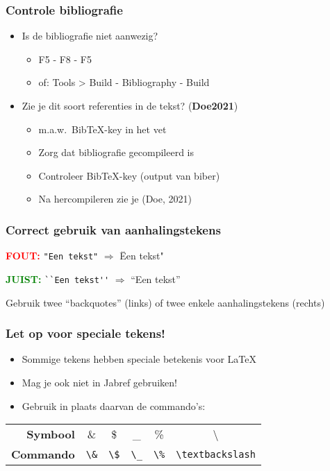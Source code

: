 \documentclass[aspectratio=169]{beamer}
\begin{document}
\begin{frame}
  \frametitle{Controle bibliografie}

  \begin{itemize}
    \item Is de bibliografie niet aanwezig?
          \begin{itemize}
            \item F5 - F8 - F5
            \item of: Tools > Build - Bibliography - Build
          \end{itemize}
    \item Zie je dit soort referenties in de tekst? (\textbf{Doe2021})
          \begin{itemize}
            \item m.a.w.~Bib{\TeX}-key in het vet
            \item Zorg dat bibliografie gecompileerd is
            \item Controleer Bib{\TeX}-key (output van biber)
            \item Na hercompileren zie je (Doe, 2021)
          \end{itemize}
  \end{itemize}

\end{frame}

\begin{frame}[fragile]
  \frametitle{Correct gebruik van aanhalingstekens}

  \textcolor{red}{\textbf{FOUT:}} \verb|"Een tekst"| $\Rightarrow$ \"Een tekst"

  \bigskip

  \textcolor{green}{\textbf{JUIST:}} \verb|``Een tekst''| $\Rightarrow$ ``Een tekst''

  \bigskip

  Gebruik twee ``backquotes'' (links) of twee enkele aanhalingstekens (rechts)
\end{frame}

\begin{frame}[fragile]
  \frametitle{Let op voor speciale tekens!}

  \begin{itemize}
    \item Sommige tekens hebben speciale betekenis voor {\LaTeX}
    \item Mag je ook niet in Jabref gebruiken!
    \item Gebruik in plaats daarvan de commando's:
  \end{itemize}

  \bigskip

\begin{center}
  \begin{tabular}{rccccc}
    \toprule
    \textbf{Symbool}  & \&        & \$        & \_        & \%  & \textbackslash \\
    \textbf{Commando} & \verb+\&+ & \verb+\$+ & \verb+\_+ & \verb+\%+ & \verb+\textbackslash+\\
    \bottomrule
  \end{tabular}
\end{center}
\end{frame}
\end{document}

